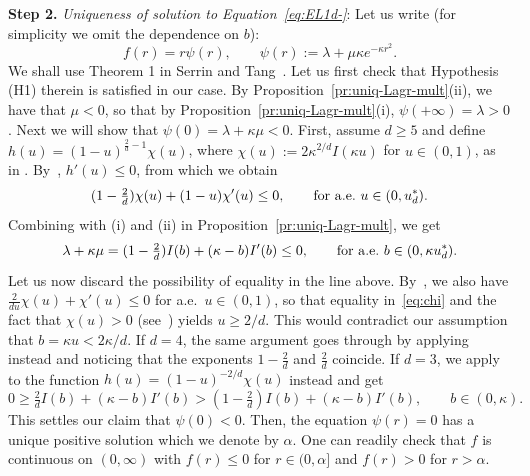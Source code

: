 \documentclass[a4paper,11pt]{amsart}
\numberwithin{equation}{section}
\newcommand{\ga}{\alpha}
\newcommand{\gk}{\kappa}
\newcommand{\gl}{\lambda}
\newcommand{\8}{\infty}
\newcommand{\beq}{\begin{equation}}
\newcommand{\eeq}{\end{equation}}
\begin{document}
%
\textbf{Step 2.} \emph{Uniqueness of solution to Equation~\eqref{eq:EL1d-}}: 
Let us write (for simplicity we omit the dependence on $b$):
\beq
f(r) = r\psi(r), \qquad \psi(r) := \gl + \mu \gk e^{-\gk r^2}.
\eeq
We shall use Theorem 1 in Serrin and Tang~\cite{SerrinTang2000}. 
Let us first check that Hypothesis (H1) therein is satisfied in our case. 
By Proposition~\ref{pr:uniq-Lagr-mult}\rm{(ii)}, we have that $\mu <0$, so that by Proposition~\ref{pr:uniq-Lagr-mult}\rm{(i)}, $\psi(+\infty) = \lambda >0$. Next we will show that $\psi(0) = \lambda +\gk\mu<0$. First, assume $d\ge 5$ and define $h(u) = (1-u)^{\frac{2}{d}-1}\chi(u)$, where $\chi(u) := 2\gk^{2/d}I(\gk u)$ for $u\in(0,1)$, as in \cite[Eq.~(1.10)]{BBH2001}. By~\cite[Theorem 5(iii)]{BBH2001}, $h'(u)\le0$, from which we obtain
\beq
\label{eq:chi}
(1-\tfrac 2d) \chi(u)  + (1-u)\chi'(u) \le0, \qquad {\rm for\ a.e.\ } u\in(0,u^*_d).
\eeq
Combining with (i) and (ii) in Proposition~\ref{pr:uniq-Lagr-mult}, we get
\beq
\gl + \gk \mu = (1-\tfrac 2d) I(b)  + (\gk-b)I'(b) \le0, \qquad {\rm for\ a.e.\ } b\in(0,\gk u^*_d).
\eeq
Let us now discard the possibility of equality in the line above. By~\cite[Theorem 3(iii)]{BBH2001}, we also have $\tfrac 2 {du} \chi(u) + \chi'(u)\le 0$ for a.e.\ $u\in(0,1)$, so that equality in~\eqref{eq:chi} and the fact that $\chi(u)>0$ (see~\cite[Theorem 3]{BBH2001})  yields $u\ge 2/d$. This would contradict our assumption that $b=\gk u < 2\gk/d$. If $d=4$, the same argument goes through by applying~\cite[Theorem 4(ii)]{BBH2001} instead and noticing that the exponents $1-\tfrac 2 d$ and $\tfrac 2d$ coincide.
If $d=3$, we apply~\cite[Theorem 4(ii)]{BBH2001} to the function $h(u) = (1-u)^{-2/d}\chi(u)$ instead and get
\beq
0\ge \tfrac 2d I(b)  + (\gk-b)I'(b) > (1-\tfrac 2d) I(b)  + (\gk-b)I'(b), \qquad b\in(0,\gk).
\eeq
This settles our claim that $\psi(0)<0$.
Then, the equation $\psi(r)=0$ has a unique positive solution which we denote by $\ga$. One can readily check that $f$ is continuous on 	$(0, \infty)$ with $f(r)\le 0$ for $r\in(0,\ga]$ and $f(r)>0$ for $r>\ga$. 
\end{document}
